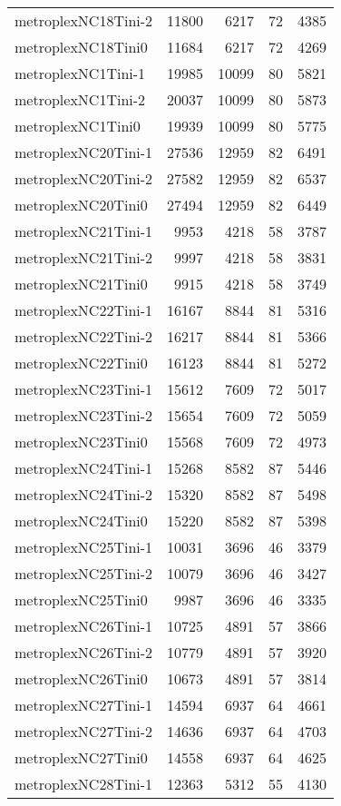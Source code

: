 \documentclass[../../../thesis.tex]{subfiles}
\begin{document}
\begin{longtable}{lrrrr}
metroplexNC18Tini-2 & 11800 & 6217 & 72 & 4385 \\
metroplexNC18Tini0 & 11684 & 6217 & 72 & 4269 \\
metroplexNC1Tini-1 & 19985 & 10099 & 80 & 5821 \\
metroplexNC1Tini-2 & 20037 & 10099 & 80 & 5873 \\
metroplexNC1Tini0 & 19939 & 10099 & 80 & 5775 \\
metroplexNC20Tini-1 & 27536 & 12959 & 82 & 6491 \\
metroplexNC20Tini-2 & 27582 & 12959 & 82 & 6537 \\
metroplexNC20Tini0 & 27494 & 12959 & 82 & 6449 \\
metroplexNC21Tini-1 & 9953 & 4218 & 58 & 3787 \\
metroplexNC21Tini-2 & 9997 & 4218 & 58 & 3831 \\
metroplexNC21Tini0 & 9915 & 4218 & 58 & 3749 \\
metroplexNC22Tini-1 & 16167 & 8844 & 81 & 5316 \\
metroplexNC22Tini-2 & 16217 & 8844 & 81 & 5366 \\
metroplexNC22Tini0 & 16123 & 8844 & 81 & 5272 \\
metroplexNC23Tini-1 & 15612 & 7609 & 72 & 5017 \\
metroplexNC23Tini-2 & 15654 & 7609 & 72 & 5059 \\
metroplexNC23Tini0 & 15568 & 7609 & 72 & 4973 \\
metroplexNC24Tini-1 & 15268 & 8582 & 87 & 5446 \\
metroplexNC24Tini-2 & 15320 & 8582 & 87 & 5498 \\
metroplexNC24Tini0 & 15220 & 8582 & 87 & 5398 \\
metroplexNC25Tini-1 & 10031 & 3696 & 46 & 3379 \\
metroplexNC25Tini-2 & 10079 & 3696 & 46 & 3427 \\
metroplexNC25Tini0 & 9987 & 3696 & 46 & 3335 \\
metroplexNC26Tini-1 & 10725 & 4891 & 57 & 3866 \\
metroplexNC26Tini-2 & 10779 & 4891 & 57 & 3920 \\
metroplexNC26Tini0 & 10673 & 4891 & 57 & 3814 \\
metroplexNC27Tini-1 & 14594 & 6937 & 64 & 4661 \\
metroplexNC27Tini-2 & 14636 & 6937 & 64 & 4703 \\
metroplexNC27Tini0 & 14558 & 6937 & 64 & 4625 \\
metroplexNC28Tini-1 & 12363 & 5312 & 55 & 4130 \\

\end{longtable}
\end{document}
